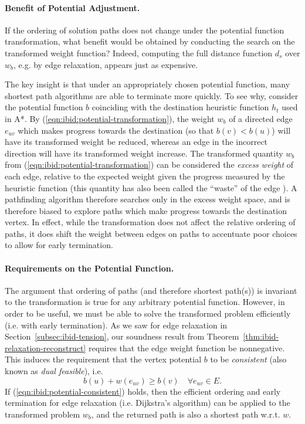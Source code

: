 \paragraph{Benefit of Potential Adjustment.}
If the ordering of solution paths does not change under the
potential function transformation,
what benefit would be obtained by conducting the search
on the transformed weight function?
Indeed,
computing the full distance function $d_s$ over $w_b$,
e.g. by edge relaxation,
appears just as expensive.

The key insight is that under an appropriately chosen potential function,
many shortest path algorithms are able to terminate more quickly.
To see why,
consider the potential function $b$ coinciding with
the destination heuristic function $h_t$ used in A*.
By (\ref{eqn:ibid:potential-transformation}),
the weight $w_b$ of a directed edge $e_{uv}$ which makes
progress towards the destination (so that $b(v) < b(u)$)
will have its transformed weight be reduced,
whereas an edge in the incorrect direction will have its transformed
weight increase.
The transformed quantity $w_b$
from (\ref{eqn:ibid:potential-transformation})
can be considered the \emph{excess weight} of each edge,
relative to the expected weight given the progress measured by the
heuristic function
(this quantity has also been called the ``waste'' of the edge
\citep{pohl1969bidirectional}).
A pathfinding algorithm therefore searches only in the excess weight
space,
and is therefore biased to explore paths which make progress towards
the destination vertex.
In effect,
while the transformation does not affect the relative ordering of
paths,
it does shift the weight between edges on paths to accentuate poor
choices to allow for early termination.

\paragraph{Requirements on the Potential Function.}
The argument that ordering of paths (and therefore shortest path(s))
is invariant to the transformation is true for any arbitrary
potential function.
However,
in order to be useful,
we must be able to solve the transformed problem efficiently
(i.e. with early termination).
As we saw for edge relaxation in Section~\ref{subsec:ibid-tension},
our soundness result from Theorem~\ref{thm:ibid-relaxation-reconstruct}
requires that the edge weight function be nonnegative.
This induces the requirement that
the vertex potential $b$ to be \emph{consistent}
(also known as \emph{dual feasible}), i.e.
\begin{equation}
   b(u) + w(e_{uv}) \geq b(v) \quad\forall e_{uv} \in E.
   \label{eqn:ibid:potential-consistent}
\end{equation}
If (\ref{eqn:ibid:potential-consistent}) holds,
then the efficient ordering and early termination
for edge relaxation (i.e. Dijkstra's algorithm)
can be applied to the transformed problem $w_b$,
and the returned path is also a shortest path w.r.t. $w$. 

